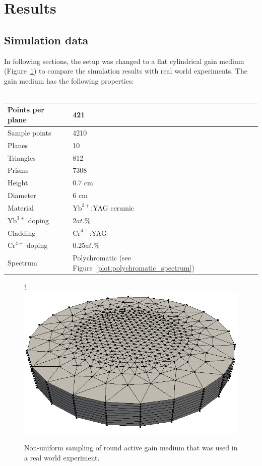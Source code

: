 \section{Results}

\subsection{Simulation data}
In following sections, the setup was changed to a flat cylindrical gain medium 
(Figure~\ref{graphic:samples_round}) to compare the simulation
results with real world experiments. The gain medium has the following
properties:
\\
\\ 
\begin{tabular}{| l | l |}
\hline
Points per plane        & 421\\
\hline
Sample points           & 4210\\
\hline
Planes                  & 10\\
\hline
Triangles               & 812\\
\hline
Prisms                  & 7308\\
\hline
Height                  & 0.7 cm\\
\hline
Diameter                & 6 cm\\
\hline
Material                & $\text{Yb}^{3+}$:YAG ceramic\\
\hline
$\text{Yb}^{3+}$ doping & $2at.\%$\\
\hline
Cladding                & $\text{Cr}^{4+}$:YAG\\
\hline
$\text{Cr}^{4+}$ doping & $0.25at.\%$\\
\hline
Spectrum                & Polychromatic (see Figure~\ref{plot:polychromatic_spectrum})\\
\hline
\end{tabular}

\begin{figure}[H]
  \centerline{
     {!} {\includegraphics{graphics/samples_round.png}}
  }
  \caption{Non-uniform sampling of round active gain medium that was
    used in a real world experiment.}
\label{graphic:samples_round}
\end{figure}

